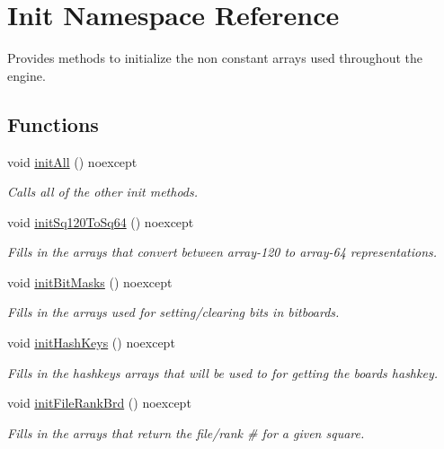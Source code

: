 \hypertarget{namespaceInit}{}\section{Init Namespace Reference}
\label{namespaceInit}


Provides methods to initialize the non constant arrays used throughout the engine.  


\subsection*{Functions}
\begin{DoxyCompactItemize}
\item 
void \mbox{\hyperlink{namespaceInit_a1f7b3ccd301db5369963fb7a9bd86d42}{init\+All}} () noexcept
\begin{DoxyCompactList}\small\item\em Calls all of the other \textquotesingle{}init\textquotesingle{} methods. \end{DoxyCompactList}\item 
void \mbox{\hyperlink{namespaceInit_a632a82ed6ce4587f5977a9089477d13a}{init\+Sq120\+To\+Sq64}} () noexcept
\begin{DoxyCompactList}\small\item\em Fills in the arrays that convert between array-\/120 to array-\/64 representations. \end{DoxyCompactList}\item 
void \mbox{\hyperlink{namespaceInit_ae0ffdba0cdf68df3778883fc7d1d8a5f}{init\+Bit\+Masks}} () noexcept
\begin{DoxyCompactList}\small\item\em Fills in the arrays used for setting/clearing bits in bitboards. \end{DoxyCompactList}\item 
void \mbox{\hyperlink{namespaceInit_a746ad8efce2e70882c0b862407056fe5}{init\+Hash\+Keys}} () noexcept
\begin{DoxyCompactList}\small\item\em Fills in the hashkeys arrays that will be used to for getting the board\textquotesingle{}s hashkey. \end{DoxyCompactList}\item 
void \mbox{\hyperlink{namespaceInit_abf211e7bffeba17a44b4da8cd83dbfcd}{init\+File\+Rank\+Brd}} () noexcept
\begin{DoxyCompactList}\small\item\em Fills in the arrays that return the file/rank \# for a given square. \end{DoxyCompactList}\item 

\end{DoxyCompactItemize}
